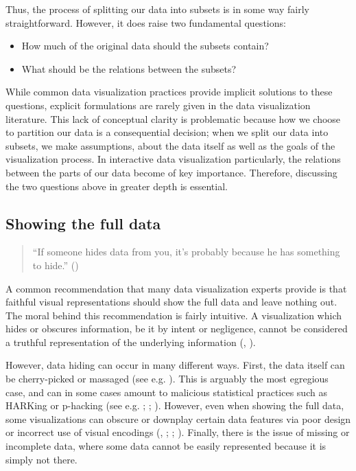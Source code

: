 \documentclass[
]{book}
\providecommand{\tightlist}{%
  \setlength{\itemsep}{0pt}\setlength{\parskip}{0pt}}
\theoremstyle{definition}
\theoremstyle{definition}
\theoremstyle{definition}
\theoremstyle{definition}
\theoremstyle{remark}
\begin{document}
Thus, the process of splitting our data into subsets is in some way fairly straightforward. However, it does raise two fundamental questions:

\begin{itemize}
\tightlist
\item
  How much of the original data should the subsets contain?
\item
  What should be the relations between the subsets?
\end{itemize}

While common data visualization practices provide implicit solutions to these questions, explicit formulations are rarely given in the data visualization literature. This lack of conceptual clarity is problematic because how we choose to partition our data is a consequential decision; when we split our data into subsets, we make assumptions, about the data itself as well as the goals of the visualization process. In interactive data visualization particularly, the relations between the parts of our data become of key importance. Therefore, discussing the two questions above in greater depth is essential.

\subsection{Showing the full data}\label{show-all-data}

\begin{quote}
``If someone hides data from you, it's probably because he has something to hide.'' ()
\end{quote}

A common recommendation that many data visualization experts provide is that faithful visual representations should show the full data and leave nothing out. The moral behind this recommendation is fairly intuitive. A visualization which hides or obscures information, be it by intent or negligence, cannot be considered a truthful representation of the underlying information (, ).

However, data hiding can occur in many different ways. First, the data itself can be cherry-picked or massaged (see e.g. ). This is arguably the most egregious case, and can in some cases amount to malicious statistical practices such as HARKing or p-hacking (see e.g. ; ; ). However, even when showing the full data, some visualizations can obscure or downplay certain data features via poor design or incorrect use of visual encodings (, ; ; ). Finally, there is the issue of missing or incomplete data, where some data cannot be easily represented because it is simply not there.
\end{document}
